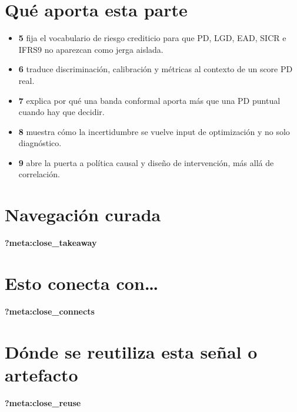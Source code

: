 \documentclass[
  spanish,
  11pt,
  letterpaper,
]{scrbook}
\providecommand{\tightlist}{%
  \setlength{\itemsep}{0pt}\setlength{\parskip}{0pt}}
\theoremstyle{plain}
\theoremstyle{remark}
\begin{document}
\section{Qué aporta esta parte}\label{quuxe9-aporta-esta-parte}

\begin{itemize}
\tightlist
\item
  \textbf{5} fija el vocabulario de riesgo crediticio para que PD, LGD,
  EAD, SICR e IFRS9 no aparezcan como jerga aislada.
\item
  \textbf{6} traduce discriminación, calibración y métricas al contexto
  de un score PD real.
\item
  \textbf{7} explica por qué una banda conformal aporta más que una PD
  puntual cuando hay que decidir.
\item
  \textbf{8} muestra cómo la incertidumbre se vuelve input de
  optimización y no solo diagnóstico.
\item
  \textbf{9} abre la puerta a política causal y diseño de intervención,
  más allá de correlación.
\end{itemize}

\section{Navegación curada}\label{navegaciuxf3n-curada}

\begin{tcolorbox}[enhanced jigsaw, arc=.35mm, bottomrule=.15mm, bottomtitle=1mm, breakable, colback=white, colbacktitle=quarto-callout-tip-color!10!white, colframe=quarto-callout-tip-color-frame, coltitle=black, left=2mm, leftrule=.75mm, opacityback=0, opacitybacktitle=0.6, rightrule=.15mm, title=\textcolor{quarto-callout-tip-color}{\faLightbulb}\hspace{0.5em}{Qué debes quedarte}, titlerule=0mm, toprule=.15mm, toptitle=1mm]

\textbf{?meta:close\_takeaway}

\section{Esto conecta con\ldots{}}\label{esto-conecta-con}

\textbf{?meta:close\_connects}

\section{Dónde se reutiliza esta señal o
artefacto}\label{duxf3nde-se-reutiliza-esta-seuxf1al-o-artefacto}

\textbf{?meta:close\_reuse}

\end{tcolorbox}
\end{document}
